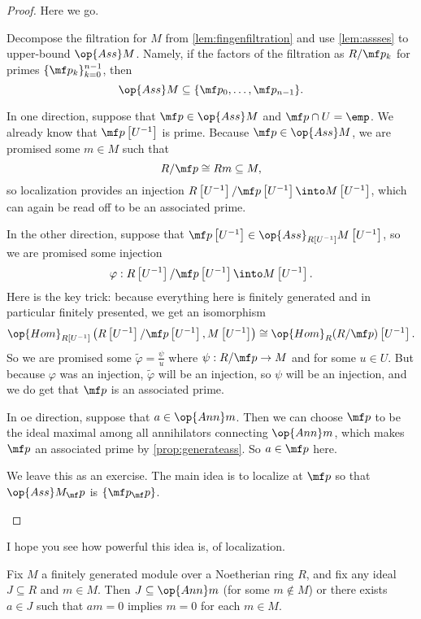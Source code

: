 \begin{proof}
	Here we go.
	\begin{listalph}
		\item Decompose the filtration for $M$ from \autoref{lem:fingenfiltration} and use \autoref{lem:assses} to upper-bound $\op{Ass}M$. Namely, if the factors of the filtration as $R/\mf p_k$ for primes $\{\mf p_k\}_{k=0}^{n-1}$, then
		\[\op{Ass}M\subseteq\{\mf p_0,\ldots,\mf p_{n-1}\}.\]
		\item In one direction, suppose that $\mf p\in\op{Ass}M$ and $\mf p\cap U=\emp$. We already know that $\mf p\left[U^{-1}\right]$ is prime. Because $\mf p\in\op{Ass}M$, we are promised some $m\in M$ such that
		\[R/\mf p\cong Rm\subseteq M,\]
		so localization provides an injection $R\left[U^{-1}\right]/\mf p\left[U^{-1}\right]\into M\left[U^{-1}\right]$, which can again be read off to be an associated prime. %

		In the other direction, suppose that $\mf p\left[U^{-1}\right]\in\op{Ass}_{R\left[U^{-1}\right]}M\left[U^{-1}\right]$, so we are promised some injection
		\[\varphi:R\left[U^{-1}\right]/\mf p\left[U^{-1}\right]\into M\left[U^{-1}\right].\]
		Here is the key trick: because everything here is finitely generated and in particular finitely presented, we get an isomorphism
		\[\op{Hom}_{R\left[U^{-1}\right]}\left(R\left[U^{-1}\right]/\mf p\left[U^{-1}\right],M\left[U^{-1}\right]\right)\cong\op{Hom}_R(R/\mf p)\left[U^{-1}\right].\]
		So we are promised some $\widetilde\varphi=\frac\psi u$ where $\psi:R/\mf p\to M$ and for some $u\in U$. But because $\varphi$ was an injection, $\widetilde\varphi$ will be an injection, so $\psi$ will be an injection, and we do get that $\mf p$ is an associated prime.
		\item In oe direction, suppose that $a\in\op{Ann}m$. Then we can choose $\mf p$ to be the ideal maximal among all annihilators connecting $\op{Ann}m$, which makes $\mf p$ an associated prime by \autoref{prop:generateass}. So $a\in\mf p$ here.
		\item We leave this as an exercise. The main idea is to localize at $\mf p$ so that $\op{Ass}M_\mf p$ is $\{\mf p_\mf p\}$.
		\qedhere
	\end{listalph}
\end{proof}
\begin{quot}
	I hope you see how powerful this idea is, of localization.
\end{quot}
\begin{corollary}
	Fix $M$ a finitely generated module over a Noetherian ring $R$, and fix any ideal $J\subseteq R$ and $m\in M$. Then $J\subseteq\op{Ann}m$ (for some $m\notin M$) or there exists $a\in J$ such that $am=0$ implies $m=0$ for each $m\in M$.
\end{corollary}
